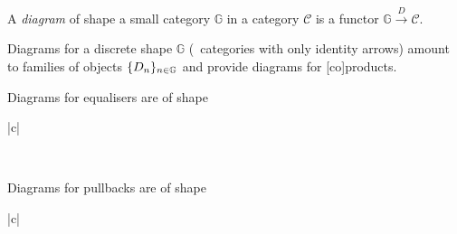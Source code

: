 \begin{definition}
A \emph{diagram} of shape a small category $\mathbb{G}$ in a category
$\mathcal{C}$ is a functor $\mathbb{G} \xrightarrow{D} \mathcal{C}$.
\end{definition}

\begin{example}
Diagrams for a discrete shape $\mathbb{G}$ (\ie~categories with only identity
arrows) amount to families of objects $\{   D_n  \}_{n \in \mathbb{G}}$ and
provide diagrams for [co]products.
\end{example}

\begin{example}
Diagrams for equalisers are of shape
\begin{center}\begin{tabular}{|c|}\hline
  \\ \hline
  \end{tabular}\end{center}
\end{example}

\begin{example}
Diagrams for pullbacks are of shape
  \begin{center}\begin{tabular}{|c|}\hline
    \\ \hline\end{tabular}
  \end{center}
\end{example}

